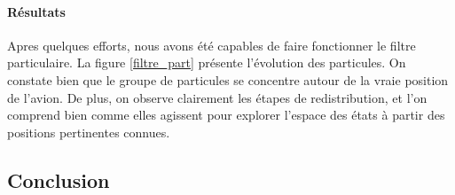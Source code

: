 \documentclass{article}
\begin{document}
 \paragraph{Résultats}
 Apres quelques efforts, nous avons été capables de faire fonctionner le 
 filtre particulaire. La figure \ref{filtre_part} présente l'évolution des
 particules. On constate bien que le groupe de particules se concentre autour de la 
 vraie position de l'avion. De plus, on observe clairement les étapes de redistribution,
 et l'on comprend bien comme elles agissent pour explorer l'espace des états à partir
 des positions pertinentes connues.
  

\subsection{Conclusion}

\newpage


\end{document}

